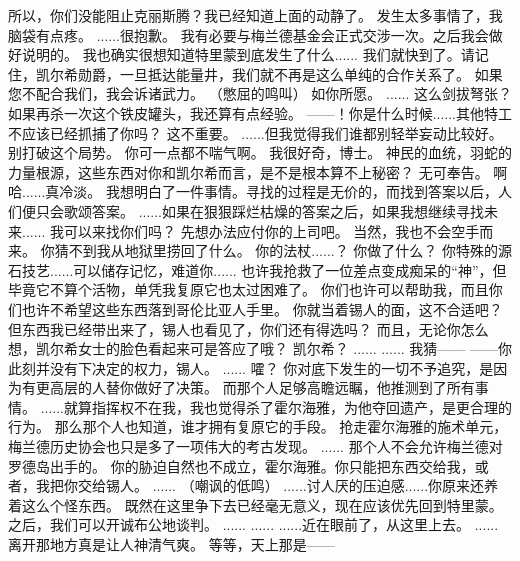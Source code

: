\documentclass[openany]{book}
\begin{document}
\begin{dialogue}
     所以，你们没能阻止克丽斯腾？我已经知道上面的动静了。
     发生太多事情了，我脑袋有点疼。
     ......很抱歉。
     我有必要与梅兰德基金会正式交涉一次。之后我会做好说明的。
     我也确实很想知道特里蒙到底发生了什么......
     我们就快到了。请记住，凯尔希勋爵，一旦抵达能量井，我们就不再是这么单纯的合作关系了。
     如果您不配合我们，我会诉诸武力。
     （憋屈的鸣叫）
     如你所愿。
     ......
     这么剑拔弩张？如果再杀一次这个铁皮罐头，我还算有点经验。
     ——！你是什么时候......其他特工不应该已经抓捕了你吗？
     这不重要。
     ......但我觉得我们谁都别轻举妄动比较好。别打破这个局势。
     你可一点都不喘气啊。
     我很好奇，博士。
     神民的血统，羽蛇的力量根源，这些东西对你和凯尔希而言，是不是根本算不上秘密？
     无可奉告。
     啊哈......真冷淡。
     我想明白了一件事情。寻找的过程是无价的，而找到答案以后，人们便只会歌颂答案。
     ......如果在狠狠踩烂枯燥的答案之后，如果我想继续寻找未来......
     我可以来找你们吗？
     先想办法应付你的上司吧。
     当然，我也不会空手而来。
     你猜不到我从地狱里捞回了什么。
     你的法杖......？
     你做了什么？
     你特殊的源石技艺......可以储存记忆，难道你......
     也许我抢救了一位差点变成痴呆的“神”，但毕竟它不算个活物，单凭我复原它也太过困难了。
     你们也许可以帮助我，而且你们也许不希望这些东西落到哥伦比亚人手里。
     你就当着锡人的面，这不合适吧？
     但东西我已经带出来了，锡人也看见了，你们还有得选吗？
     而且，无论你怎么想，凯尔希女士的脸色看起来可是答应了哦？
     凯尔希？
     ......
     ......
     我猜——
     ——你此刻并没有下决定的权力，锡人。
     ......
     嚯？
     你对底下发生的一切不予追究，是因为有更高层的人替你做好了决策。
     而那个人足够高瞻远瞩，他推测到了所有事情。
     ......就算指挥权不在我，我也觉得杀了霍尔海雅，为他夺回遗产，是更合理的行为。
     那么那个人也知道，谁才拥有复原它的手段。
     抢走霍尔海雅的施术单元，梅兰德历史协会也只是多了一项伟大的考古发现。
     ......
     那个人不会允许梅兰德对罗德岛出手的。
     你的胁迫自然也不成立，霍尔海雅。你只能把东西交给我，或者，我把你交给锡人。
     ......
     （嘲讽的低鸣）
     ......讨人厌的压迫感......你原来还养着这么个怪东西。
     既然在这里争下去已经毫无意义，现在应该优先回到特里蒙。
     之后，我们可以开诚布公地谈判。
     ......
     ......
     ......近在眼前了，从这里上去。
     ......离开那地方真是让人神清气爽。
     等等，天上那是——
\end{dialogue}\par
\end{document}
